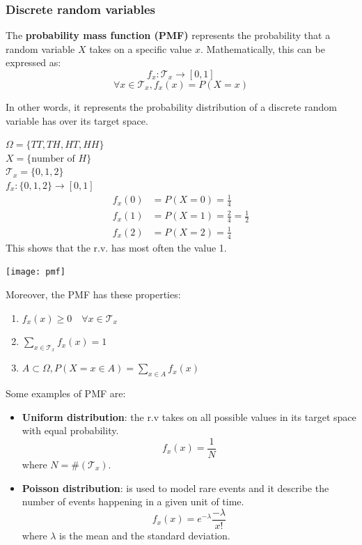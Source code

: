 \documentclass{article}
\begin{document}
\subsubsection{Discrete random variables}
\begin{definition}
    The \textbf{probability mass function (PMF)} represents the probability that a
    random variable $X$ takes on a specific value $x$. Mathematically, this
    can be expressed as: 
    $$f_x:\mathcal{T}_x\to[0,1]$$
    $$\forall x\in \mathcal{T}_x,f_x(x)=P(X=x)$$
\end{definition}
In other words, it represents the probability distribution of a discrete
random variable has over its target space.
\begin{example}
   $\Omega=\{TT,TH,HT,HH\}$\\
   $X=\{\text{number of }H\}$\\
   $\mathcal{T}_x=\{0,1,2\}$\\
   $f_x:\{0,1,2\}\to[0,1]$
   $$
   \begin{aligned}
       f_x(0)&=P(X=0)=\frac{1}{4}\\
       f_x(1)&=P(X=1)=\frac{2}{4}=\frac{1}{2}\\
       f_x(2)&=P(X=2)=\frac{1}{4}
   \end{aligned}
   $$
   This shows that the r.v. has most often the value 1.
   \begin{center}
       \texttt{[image: pmf]}
   \end{center}    
\end{example}
Moreover, the PMF has these properties:
\begin{enumerate}
    \item $f_x(x)\geq0\quad\forall x\in\mathcal{T}_x$
    \item $\sum_{x\in\mathcal{T}_x}f_x(x)=1$
    \item $A\subset\Omega,P(X=x\in A)=\sum_{x\in A}f_x(x)$
\end{enumerate}
Some examples of PMF are:
\begin{itemize}
    \item \textbf{Uniform distribution}: the r.v takes on all possible values
        in its target space with equal probability. 
        $$f_x(x)=\frac{1}{N}$$
        where $N=\#(\mathcal{T}_x)$.
    \item \textbf{Poisson distribution}: is used to model rare events and it
        describe the number of events happening in a given unit of time.
        $$f_x(x)=e^{-\lambda}\frac{-\lambda}{x!}$$
        where $\lambda$ is the mean and the standard deviation.
\end{itemize}
\end{document}

